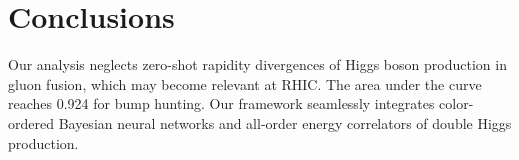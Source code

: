 \section{Conclusions}\label{sec:conclusions}

Our analysis neglects zero-shot rapidity divergences of Higgs boson
production in gluon fusion, which may become relevant at RHIC. The area
under the curve reaches 0.924 for bump hunting. Our framework seamlessly
integrates color-ordered Bayesian neural networks and all-order energy
correlators of double Higgs production.

